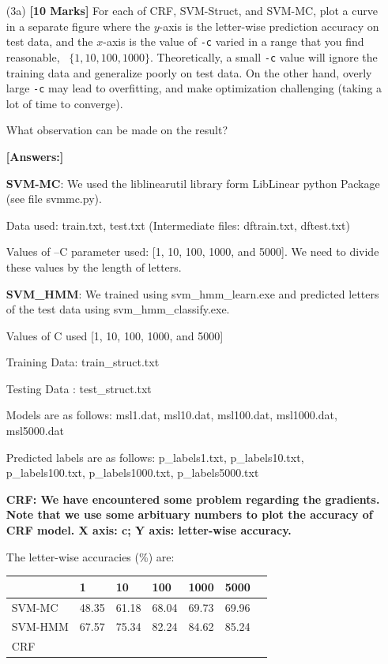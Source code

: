 \documentclass[11pt]{report}
\begin{document}
\begin{itemize}
	\item[(3a)] {\bf [10 Marks]} For each of CRF, SVM-Struct, and SVM-MC,
	plot a curve in a separate figure where the $y$-axis is the letter-wise prediction accuracy on test data,
	and the $x$-axis is the value of \verb#-c# varied in a range that you find reasonable,
	\eg\ $\{1, 10, 100, 1000\}$.
	Theoretically, a small \verb#-c# value will ignore the training data and generalize poorly on test data.
	On the other hand, overly large \verb#-c# may lead to overfitting, and make optimization challenging (taking a lot of time to converge).
	
	What observation can be made on the result?

	{\bf [Answers:]} 

	{\bf{SVM-MC}}: We used the liblinearutil library form LibLinear python Package (see file svmmc.py). 

	Data used: train.txt, test.txt (Intermediate files: dftrain.txt, dftest.txt)

	Values of –C parameter used: [1, 10, 100, 1000, and 5000]. We need to divide these values by the length of letters. 

	{\bf{SVM\_HMM}}: We trained using svm\_hmm\_learn.exe and predicted letters of the test data using svm\_hmm\_classify.exe.

	Values of C used [1, 10, 100, 1000, and 5000]

	Training Data: train\_struct.txt
	
	Testing Data : test\_struct.txt

	Models are as follows:  msl1.dat, msl10.dat, msl100.dat, msl1000.dat, msl5000.dat

	Predicted labels are as follows:  p\_labels1.txt, p\_labels10.txt, p\_labels100.txt, p\_labels1000.txt, p\_labels5000.txt
	
	{\bf{CRF}: We have encountered some problem regarding the gradients. Note that we use some arbituary numbers to plot the accuracy of CRF model. X axis: c; Y axis: letter-wise accuracy. }

	The letter-wise accuracies (\%) are: 
	\begin{table}[h]
	\centering
	\begin{tabular}{lllllll}
	           & 1     & 10    & 100   & 1000  & 5000  \\ %
	\hline
	SVM-MC     & 48.35 & 61.18 & 68.04 & 69.73 & 69.96 \\ %
	SVM-HMM & 67.57 & 75.34 & 82.24 & 84.62 & 85.24 \\
	CRF        &       &       &       &       &       \\
	\hline
	\end{tabular}
	\end{table}


\end{itemize}
\end{document}
